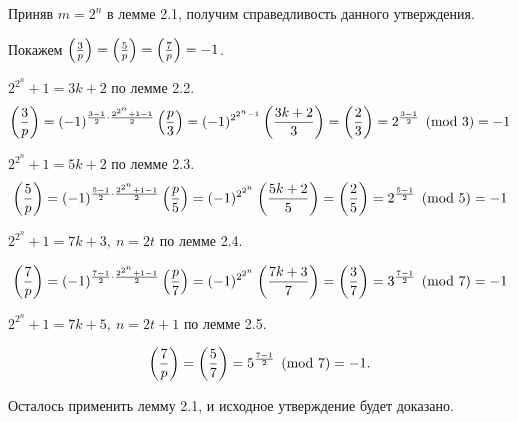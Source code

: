 Приняв $m = 2^n$ в лемме 2.1, получим справедливость данного утверждения.



Покажем $\left( \frac{3}{p} \right) = \left( \frac{5}{p} \right) = \left( \frac{7}{p} \right) = -1$.

$2^{2^n} + 1 = 3k + 2$ по лемме 2.2.
$$\left( \frac{3}{p} \right) = (-1) ^ {\frac{3 - 1}{2} \cdot \frac{2^{2^n} + 1 - 1}{2}} \left( \frac{p}{3} \right) = (-1) ^ {2^{2^n - 1}} \left( \frac{3k+2}{3} \right) = \left( \frac{2}{3} \right) = 2^{\frac{3-1}{2}} \pmod 3 = -1$$

$2^{2^n} + 1 = 5k + 2$ по лемме 2.3.
$$\left( \frac{5}{p} \right) = (-1) ^ {\frac{5 - 1}{2} \cdot \frac{2^{2^n} + 1 - 1}{2}} \left( \frac{p}{5} \right) = (-1) ^ {2^{2^n}} \left( \frac{5k+2}{5} \right) = \left( \frac{2}{5} \right) = 2^{\frac{5-1}{2}} \pmod 5= -1$$

$2^{2^n} + 1 = 7k + 3,\ n = 2t$ по лемме 2.4.

$$\left( \frac{7}{p} \right) = (-1) ^ {\frac{7 - 1}{2} \cdot \frac{2^{2^n} + 1 - 1}{2}} \left( \frac{p}{7} \right) = (-1) ^ {2^{2^n}} \left( \frac{7k+3}{7} \right) = \left( \frac{3}{7} \right) = 3^{\frac{7-1}{2}} \pmod 7 = -1$$

$2^{2^n} + 1 = 7k + 5,\ n = 2t + 1$ по лемме 2.5.

$$\left( \frac{7}{p} \right) = \left( \frac{5}{7} \right) = 5^{\frac{7-1}{2}} \pmod 7 = -1.$$

Осталось применить лемму 2.1, и исходное утверждение будет доказано. 
